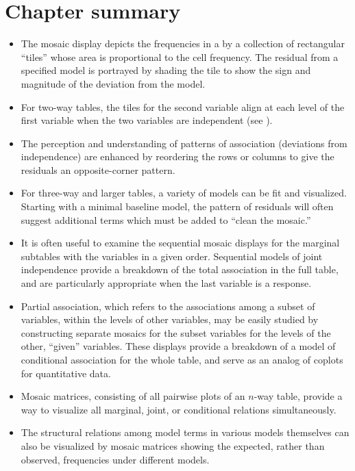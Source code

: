 \section{Chapter summary}
\begin{itemize}
\item The mosaic display depicts the frequencies in a \ctab{} by a collection of rectangular ``tiles''
whose area is proportional to the cell frequency.
The residual from a specified model is portrayed by shading the tile
to show the sign and magnitude of the deviation from the model.

\item For two-way tables, the tiles for the second variable align
at each level of the first variable when the two variables are independent
(see ).

\item The perception and understanding of patterns of association
(deviations from independence) are enhanced by reordering the
rows or columns to give the residuals an opposite-corner pattern.

\item For three-way and larger tables, a variety of models can be fit
and visualized.
Starting with a minimal baseline model, the pattern of residuals
will often suggest additional terms which must be added to
``clean the mosaic.''
\item It is often useful to examine the sequential mosaic
displays for the marginal subtables with the variables in a given order.
Sequential models of joint independence provide a breakdown of the
total association in the full table, and are particularly
appropriate when the last variable is a response.

\item Partial association, which refers to the associations among
a subset of variables, within the levels of other variables,
may be easily studied by constructing separate mosaics for the subset
variables for the levels of the other, ``given'' variables.
These displays provide a breakdown of a model of conditional association
for the whole table, and serve as an analog of coplots for quantitative
data.

\item Mosaic matrices, consisting of all pairwise plots of an $n$-way
table, provide a way to visualize all marginal, joint, or conditional 
relations simultaneously.

\item The structural relations among model terms in various \loglin{}
models themselves can also be visualized by mosaic matrices
showing the expected, rather than observed, frequencies under different
models.
\end{itemize}

